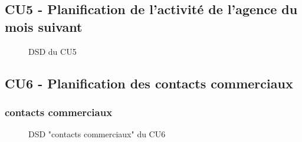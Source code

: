 \subsection{CU5 - Planification de l’activité de l’agence du mois suivant}
\begin{figure}[H]
\noindent{}
\caption{DSD du CU5}
\end{figure}


\subsection{CU6 - Planification des contacts commerciaux}

\subsubsection{contacts commerciaux}
\begin{figure}[H]
\noindent{}
\caption{DSD "contacts commerciaux" du CU6}
\end{figure}

